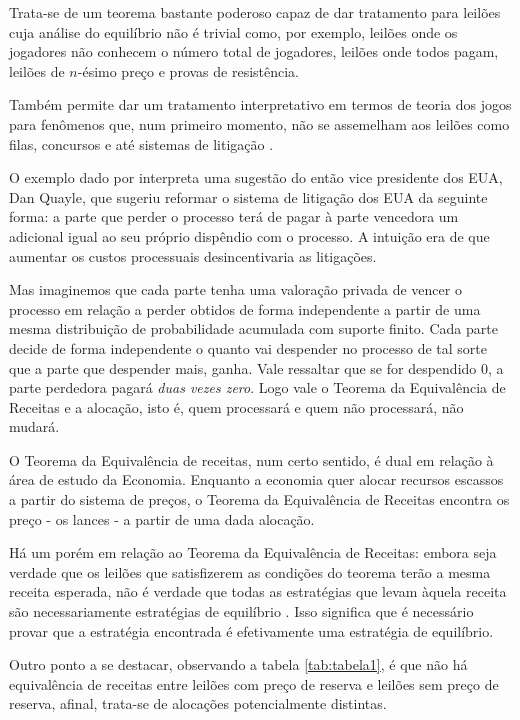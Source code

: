 Trata-se de um teorema bastante poderoso capaz de dar tratamento para leilões cuja análise do equilíbrio não é trivial como, por exemplo, leilões onde os jogadores não conhecem o número total de jogadores, leilões onde todos pagam, leilões de $n$-ésimo preço e provas de resistência.

Também permite dar um tratamento interpretativo em termos de teoria dos jogos para fenômenos que, num primeiro momento, não se assemelham aos leilões como filas, concursos e até sistemas de litigação \citet{Klemperer2004-qd}.

O exemplo dado por \citet{Klemperer2004-qd} interpreta uma sugestão do então vice presidente dos EUA, Dan Quayle, que sugeriu reformar o sistema de litigação dos EUA da seguinte forma: a parte que perder o processo terá de pagar à parte vencedora um adicional igual ao seu próprio dispêndio com o processo. A intuição era de que aumentar os custos processuais desincentivaria as litigações.

Mas imaginemos que cada parte tenha uma valoração privada de vencer o processo em relação a perder obtidos de forma independente a partir de uma mesma distribuição de probabilidade acumulada com suporte finito. Cada parte decide de forma independente o quanto vai despender no processo de tal sorte que a parte que despender mais, ganha. Vale ressaltar que se for despendido 0, a parte perdedora pagará \emph{duas vezes zero}. Logo vale o Teorema da Equivalência de Receitas e a alocação, isto é, quem processará e quem não processará, não mudará.

O Teorema da Equivalência de receitas, num certo sentido, é dual em relação à área de estudo da Economia. Enquanto a economia quer alocar recursos escassos a partir do sistema de preços, o Teorema da Equivalência de Receitas encontra os preço - os lances - a partir de uma dada alocação.

Há um porém em relação ao Teorema da Equivalência de Receitas: embora seja verdade que os leilões que satisfizerem as condições do teorema terão a mesma receita esperada, não é verdade que todas as estratégias que levam àquela receita são necessariamente estratégias de equilíbrio \citet{Shoham2008}. Isso significa que é necessário provar que a estratégia encontrada é efetivamente uma estratégia de equilíbrio.

Outro ponto a se destacar, observando a tabela \ref{tab:tabela1}, é que não há equivalência de receitas entre leilões com preço de reserva e leilões sem preço de reserva, afinal, trata-se de alocações potencialmente distintas.


